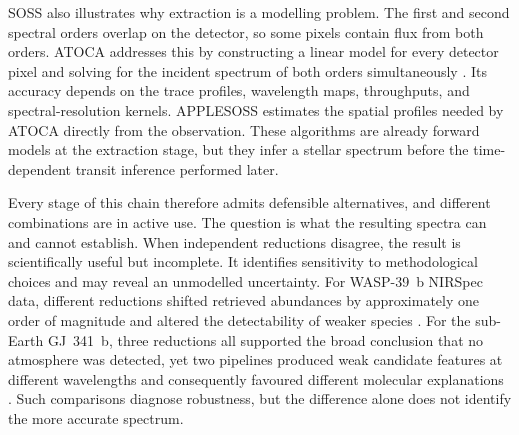 
SOSS also illustrates why extraction is a modelling problem. The first and
second spectral orders overlap on the detector, so some pixels contain flux
from both orders. ATOCA addresses this by constructing a linear model for every
detector pixel and solving for the incident spectrum of both orders
simultaneously \citep{DarveauBernierEtAl2022}. Its accuracy depends on the trace
profiles, wavelength maps, throughputs, and spectral-resolution kernels.
APPLESOSS \citep{RadicaEtAl2022} estimates the spatial profiles needed by ATOCA
directly from the observation. These algorithms are already forward models
at the extraction stage, but they infer a stellar spectrum before the
time-dependent transit inference performed later.


Every stage of this chain therefore admits defensible alternatives, and
different combinations are in active use. The question is what the resulting
spectra can and cannot establish. When independent reductions disagree, the
result is scientifically useful but incomplete. It identifies sensitivity to
methodological choices and may reveal an unmodelled uncertainty. For
WASP-39~b NIRSpec data, different reductions shifted retrieved abundances by
approximately one order of magnitude and altered the detectability of weaker
species \citep{ConstantinouEtAl2023}. For the sub-Earth
GJ~341~b, three reductions all supported the broad conclusion that no atmosphere
was detected, yet two pipelines produced weak candidate features at different
wavelengths and consequently favoured different molecular explanations
\citep{KirkEtAl2024}. Such comparisons diagnose robustness, but the difference
alone does not identify the more accurate spectrum.


